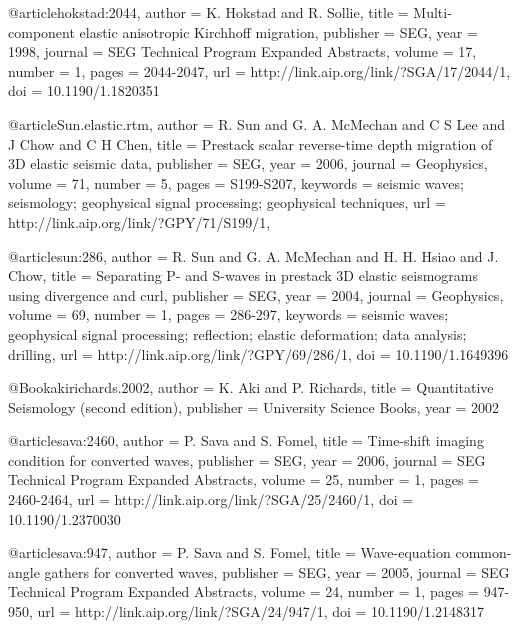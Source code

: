 {@article{hokstad:2044,
  author =	 {K. Hokstad and R. Sollie},
  title =	 {Multi-component elastic anisotropic {K}irchhoff
                  migration},
  publisher =	 {SEG},
  year =	 1998,
  journal =	 {SEG Technical Program Expanded Abstracts},
  volume =	 17,
  number =	 1,
  pages =	 {2044-2047},
  url =		 {http://link.aip.org/link/?SGA/17/2044/1},
  doi =		 {10.1190/1.1820351}
}

@article{Sun.elastic.rtm,
  author =	 {R. Sun and G. A. McMechan and C S Lee
                  and J Chow and C H Chen},
  title =	 {Prestack scalar reverse-time depth migration of 3{D}
                  elastic seismic data},
  publisher =	 {SEG},
  year =	 2006,
  journal =	 {Geophysics},
  volume =	 71,
  number =	 5,
  pages =	 {S199-S207},
  keywords =	 {seismic waves; seismology; geophysical signal
                  processing; geophysical techniques},
  url =		 {http://link.aip.org/link/?GPY/71/S199/1},
}

@article{sun:286,
  author =	 {R. Sun and G. A. McMechan and H. H. Hsiao
                  and J. Chow},
  title =	 {Separating {P}- and {S}-waves in prestack {3D}
                  elastic seismograms using divergence and curl},
  publisher =	 {SEG},
  year =	 2004,
  journal =	 {Geophysics},
  volume =	 69,
  number =	 1,
  pages =	 {286-297},
  keywords =	 {seismic waves; geophysical signal processing;
                  reflection; elastic deformation; data analysis;
                  drilling},
  url =		 {http://link.aip.org/link/?GPY/69/286/1},
  doi =		 {10.1190/1.1649396}
}

@Book{akirichards.2002,
  author =	 {K. Aki and P. Richards},
  title =	 {Quantitative Seismology (second edition)},
  publisher =	 {University Science Books},
  year =	 2002
}

@article{sava:2460,
  author =	 {P. Sava and S. Fomel},
  title =	 {Time-shift imaging condition for converted waves},
  publisher =	 {SEG},
  year =	 2006,
  journal =	 {SEG Technical Program Expanded Abstracts},
  volume =	 25,
  number =	 1,
  pages =	 {2460-2464},
  url =		 {http://link.aip.org/link/?SGA/25/2460/1},
  doi =		 {10.1190/1.2370030}
}

@article{sava:947,
  author =	 {P. Sava and S. Fomel},
  title =	 {Wave-equation common-angle gathers for converted
                  waves},
  publisher =	 {SEG},
  year =	 2005,
  journal =	 {SEG Technical Program Expanded Abstracts},
  volume =	 24,
  number =	 1,
  pages =	 {947-950},
  url =		 {http://link.aip.org/link/?SGA/24/947/1},
  doi =		 {10.1190/1.2148317}
}

}

